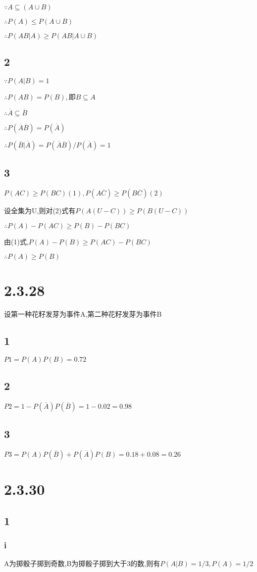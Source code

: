 \documentclass[12pt,a4paper]{ctexart}
\begin{document}
$\because A\subseteq (A\cup B)$

$\therefore P(A)\leq P(A\cup B)$

$\therefore P(AB|A)\geq P(AB|A\cup B)$
\subsection*{2}
$\because P(A|B)=1$

$\therefore P(AB)=P(B),$即$B\subseteq A$

$\therefore \overline{A}\subseteq \overline{B}$

$\therefore P(\overline{A}\overline{B})=P(\overline{A})$

$\therefore P(\overline{B}|\overline{A})=P(\overline{A}\overline{B})/P(\overline{A})=1$
\subsection*{3}
$P(AC)\geq P(BC) (1),P(A\overline{C})\geq P(B\overline{C})(2)$

设全集为U,则对(2)式有$P(A(U-C))\geq P(B(U-C))$

$\therefore P(A)-P(AC)\geq P(B)-P(BC)$

由(1)式,$P(A)-P(B)\geq P(AC)-P(BC)$

$\therefore P(A)\geq P(B)$
\section*{2.3.28}
设第一种花籽发芽为事件A,第二种花籽发芽为事件B
\subsection*{1}
$P1=P(A)P(B)=0.72$
\subsection*{2}
$P2=1-P(\overline{A})P(\overline{B})=1-0.02=0.98$
\subsection*{3}
$P3=P(A)P(\overline{B})+P(\overline{A})P(B)=0.18+0.08=0.26$
\section*{2.3.30}
\subsection*{1}
\subsubsection*{i}
A为掷骰子掷到奇数,B为掷骰子掷到大于3的数,则有$P(A|B)=1/3,P(A)=1/2$
\end{document}
